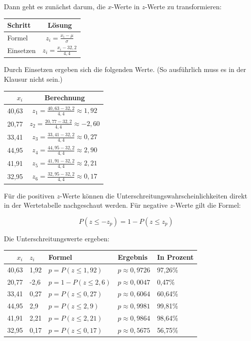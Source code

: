 \documentclass[
  11pt,
  ngerman,
  a4paper,
]{report}
\begin{document}
Dann geht es zunächst darum, die \(x\)-Werte in \(z\)-Werte zu transformieren:

\begin{table}[H]
\centering
\begin{tabular}{lc}
\toprule
\textbf{Schritt} & \textbf{Lösung}\\
\midrule
Formel & $z_{i} = \frac{x_{i} - \mu}{\sigma}$\\
Einsetzen & $z_{i} = \frac{x_{i} - 32{,}2}{4{,}4}$\\
\bottomrule
\end{tabular}
\end{table}

Durch Einsetzen ergeben sich die folgenden Werte. (So ausführlich muss es in der Klausur nicht sein.)

\begin{table}[H]
\centering
\begin{tabular}{rc}
\toprule
\textbf{$x_i$} & \textbf{Berechnung}\\
\midrule
40,63 & $z_{1}=\frac{40{,}63-32{,}2}{4{,}4}\approx1{,}92$\\
20,77 & $z_{2}=\frac{20{,}77-32{,}2}{4{,}4}\approx-2{,}60$\\
33,41 & $z_{3}=\frac{33{,}41-32{,}2}{4{,}4}\approx0{,}27$\\
44,95 & $z_{4}=\frac{44{,}95-32{,}2}{4{,}4}\approx2{,}90$\\
41,91 & $z_{5}=\frac{41{,}91-32{,}2}{4{,}4}\approx2{,}21$\\
32,95 & $z_{6}=\frac{32{,}95-32{,}2}{4{,}4}\approx0{,}17$\\
\bottomrule
\end{tabular}
\end{table}

Für die positiven \(z\)-Werte können die Unterschreitungs­wahrscheinlichkeiten direkt in der Wertetabelle nachgeschaut werden. Für negative \(z\)-Werte gilt die Formel:

\[ P(z\leq -z_p) = 1-P(z \leq z_p) \]

Die Unterschreitungswerte ergeben:

\begin{table}[H]
\centering
\begin{tabular}{rllll}
\toprule
\textbf{$x_i$} & \textbf{$z_i$} & \textbf{Formel} & \textbf{Ergebnis} & \textbf{In Prozent}\\
\midrule
40,63 & 1,92 & $p=P(z \leq 1{,}92)$ & $p \approx 0{,}9726$ & 97,26\%\\
20,77 & -2,6 & $p=1-P(z \leq 2{,}6)$ & $p \approx 0{,}0047$ & 0,47\%\\
33,41 & 0,27 & $p=P(z \leq 0{,}27)$ & $p \approx 0{,}6064$ & 60,64\%\\
44,95 & 2,9 & $p=P(z \leq 2{,}9)$ & $p \approx 0{,}9981$ & 99,81\%\\
41,91 & 2,21 & $p=P(z \leq 2{,}21)$ & $p \approx 0{,}9864$ & 98,64\%\\
32,95 & 0,17 & $p=P(z \leq 0{,}17)$ & $p \approx 0{,}5675$ & 56,75\%\\
\bottomrule
\end{tabular}
\end{table}
\end{document}
